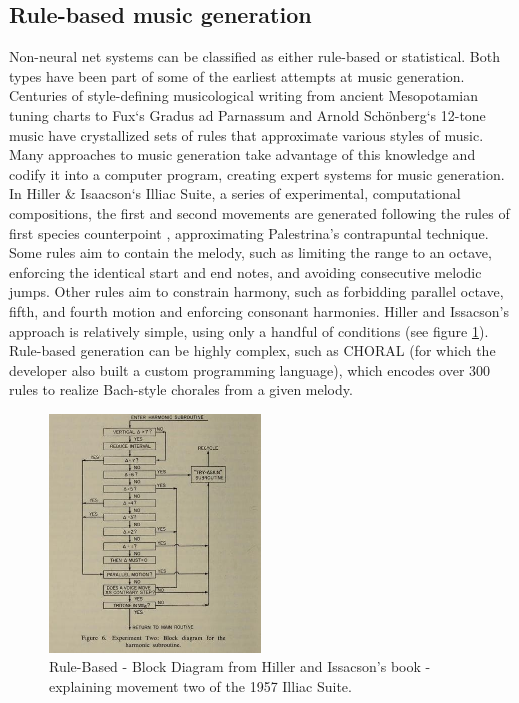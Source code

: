 \subsection{Rule-based music generation}
Non-neural net systems can be classified as either rule-based or statistical. Both types have been part of some of the earliest attempts at music generation. Centuries of style-defining musicological writing from ancient Mesopotamian tuning charts \cite{Mirelman_2013} to Fux`s Gradus ad Parnassum \cite{Fux_1725} and Arnold Schönberg`s 12-tone music have crystallized sets of rules that approximate various styles of music. Many approaches to music generation take advantage of this knowledge and codify it into a computer program, creating expert systems for music generation. In Hiller \& Isaacson`s Illiac Suite, a series of experimental, computational compositions, the first and second movements are generated following the rules of first species counterpoint \cite{Fux_1725}, approximating Palestrina's contrapuntal technique. Some rules aim to contain the melody, such as limiting the range to an octave, enforcing the identical start and end notes, and avoiding consecutive melodic jumps. Other rules aim to constrain harmony, such as forbidding parallel octave, fifth, and fourth motion and enforcing consonant harmonies. Hiller and Issacson's approach is relatively simple, using only a handful of conditions (see figure \ref{fig:hillerissacson}). Rule-based generation can be highly complex, such as CHORAL \cite{Ebcioğlu_1994} (for which the developer also built a custom programming language), which encodes over 300 rules to realize Bach-style chorales from a given melody. 

\begin{figure}[H]
    \centering
    \includegraphics[width=0.5\textwidth]{IMAGES/IlliacRuleBased.jpg} 
    \caption{Rule-Based - Block Diagram from Hiller and Issacson’s book  - explaining movement two of the 1957 Illiac Suite. }
    \label{fig:hillerissacson}
\end{figure}

